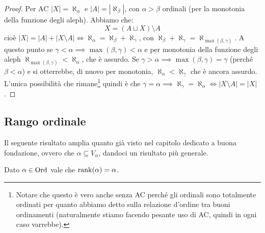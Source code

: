 \begin{proof}
	Per AC $|X| = \aleph_\alpha$ e $|A| = |\aleph_\beta|$, con $\alpha > \beta$ ordinali (per la monotonia della funzione degli aleph). Abbiamo che:
	\[ X = (A \sqcup X)\setminus A
		\]
	cioè $|X| = |A| + |X \setminus A| \iff \aleph_\alpha = \aleph_\beta + \aleph_\gamma$, con $\aleph_\beta + \aleph_\gamma = \aleph_{\max(\beta,\gamma)}$.
	A questo punto se $\gamma < \alpha \implies \max(\beta,\gamma) < \alpha$ e per monotonia della funzione degli aleph $\aleph_{\max(\beta,\gamma)} < \aleph_\alpha$, che è assurdo.
	Se $\gamma > \alpha \implies \max(\beta,\gamma) = \gamma$ (perché $\beta < \alpha$) e si otterrebbe, di nuovo per monotonia, $\aleph_\alpha < \aleph_\gamma$ che è ancora assurdo.
	L'unica possibilità che rimane\footnote{Notare che questo è vero anche senza AC perché gli ordinali sono totalmente ordinati per quanto abbiamo detto sulla relazione d'ordine tra buoni ordinamenti (naturalmente stiamo facendo pesante uso di AC, quindi in ogni caso varrebbe).}
	quindi è che $\gamma = \alpha \implies \aleph_\gamma = \aleph_\alpha \iff |X \setminus A| = |X|$.
\end{proof}

\pagebreak
\subsection{Rango ordinale}
Il seguente risultato amplia quanto già visto nel capitolo dedicato a buona fondazione, ovvero che $\alpha \subseteq V_\alpha$, dandoci un risultato più generale. 
\begin{proposition}
	Dato $\alpha \in \operatorname{Ord}$ vale che $\operatorname{rank}(\alpha) = \alpha$.
\end{proposition}

